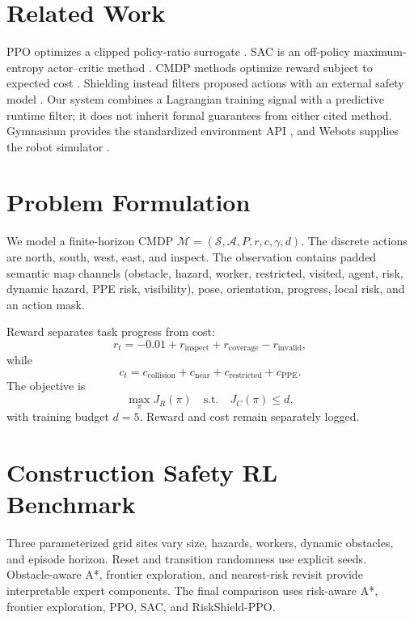 \documentclass[conference]{IEEEtran}
\begin{document}
\section{Related Work}
PPO optimizes a clipped policy-ratio surrogate \cite{schulman2017ppo}. SAC is
an off-policy maximum-entropy actor--critic method \cite{haarnoja2018sac}.
CMDP methods optimize reward subject to expected cost \cite{achiam2017cpo}.
Shielding instead filters proposed actions with an external safety model
\cite{alshiekh2018shielding}. Our system combines a Lagrangian training signal
with a predictive runtime filter; it does not inherit formal guarantees from
either cited method. Gymnasium provides the standardized environment API
\cite{towers2024gymnasium}, and Webots supplies the robot simulator
\cite{michel2004webots}.

\section{Problem Formulation}
We model a finite-horizon CMDP
$\mathcal{M}=(\mathcal{S},\mathcal{A},P,r,c,\gamma,d)$.
The discrete actions are north, south, west, east, and inspect. The observation
contains padded semantic map channels (obstacle, hazard, worker, restricted,
visited, agent, risk, dynamic hazard, PPE risk, visibility), pose,
orientation, progress, local risk, and an action mask.

Reward separates task progress from cost:
\begin{equation}
r_t=-0.01+r_{\mathrm{inspect}}+r_{\mathrm{coverage}}-r_{\mathrm{invalid}},
\end{equation}
while
\begin{equation}
c_t=c_{\mathrm{collision}}+c_{\mathrm{near}}+
c_{\mathrm{restricted}}+c_{\mathrm{PPE}}.
\end{equation}
The objective is
\begin{equation}
\max_\pi J_R(\pi)\quad\mathrm{s.t.}\quad J_C(\pi)\le d,
\end{equation}
with training budget $d=5$. Reward and cost remain separately logged.

\section{Construction Safety RL Benchmark}
Three parameterized grid sites vary size, hazards, workers, dynamic obstacles,
and episode horizon. Reset and transition randomness use explicit seeds.
Obstacle-aware A*, frontier exploration, and nearest-risk revisit provide
interpretable expert components. The final comparison uses risk-aware A*,
frontier exploration, PPO, SAC, and RiskShield-PPO.
\end{document}
